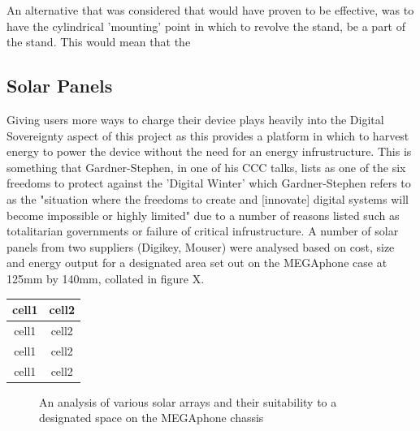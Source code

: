 An alternative that was considered that would have proven to be effective, was to have the cylindrical 'mounting' point in which to revolve the stand, be a part of the stand.
This would mean that the %


\subsection{Solar Panels}

Giving users more ways to charge their device plays heavily into the Digital Sovereignty aspect of this project as this provides a platform in which to harvest energy to power the device without the need for an energy infrustructure.
This is something that Gardner-Stephen, in one of his CCC talks, lists as one of the six freedoms to protect against the 'Digital Winter' which Gardner-Stephen refers to as the "situation where the freedoms to create and [innovate] digital systems will become impossible or highly limited" due to a number of reasons listed such as totalitarian governments or failure of critical infrustructure\cite{freedoms}.
A number of solar panels from two suppliers (Digikey, Mouser) were analysed based on cost, size and energy output for a designated area set out on the MEGAphone case at 125mm by 140mm, collated in figure X.

\begin{center}
    \begin{tabular}{ |c|c| } 
    \hline
    cell1 & cell2 \\
    \hline
    cell1 & cell2 \\ 
    \hline
    cell1 & cell2 \\ 
    \hline
    cell1 & cell2 \\
    \hline
    \end{tabular}
\end{center}

\begin{figure}
    \caption{An analysis of various solar arrays and their suitability to a designated space on the MEGAphone chassis}
    \label{fig:DesignPrinciples}
\end{figure}

